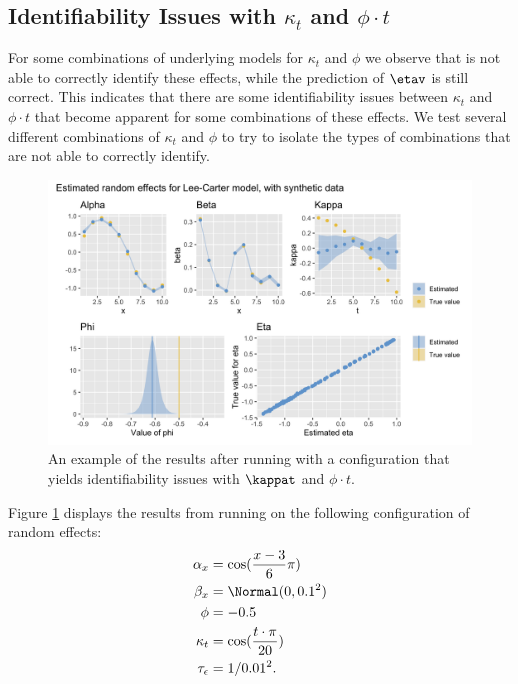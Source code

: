 \subsection{Identifiability Issues with $\kappa_t$ and $\phi\cdot t$}
\label{sec:IdentifiabilityKappa}
For some combinations of underlying models for $\kappa_t$ and $\phi$ we observe that \inlabru is not able to correctly identify these effects, while the prediction of $\etav$ is still correct. This indicates that there are some identifiability issues between $\kappa_t$ and $\phi \cdot t$ that become apparent for some combinations of these effects. We test several different combinations of $\kappa_t$ and $\phi$ to try to isolate the types of combinations that \inlabru are not able to correctly identify.
\begin{figure}[h!]
    \centering
    \includegraphics[width=0.85\linewidth]{synthetic-data/Figures/effects-LC-synthetic-identifiability.png}
    \caption{An example of the results after running \inlabru with a configuration that yields identifiability issues with $\kappat$ and $\phi \cdot t$. }
    \label{fig:unidentifiabilityKappa}
\end{figure}
Figure \ref{fig:unidentifiabilityKappa} displays the results from running \inlabru on the following configuration of random effects:
\begin{equation}
    \begin{aligned}
    \alpha_x &= \cos(\frac{x-3}{6}\pi)\\
    \beta_x &= \Normal(0,0.1^2)\\
    \phi &= -0.5\\
    \kappa_t &= \cos(\frac{t\cdot \pi}{20})\\
    \tau_{\epsilon} &= 1/0.01^2.
    \end{aligned}
\end{equation}
